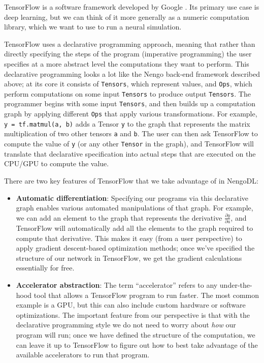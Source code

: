\documentclass{article}
\begin{document}
TensorFlow is a software framework developed by Google \citep{Abadi2016}.  Its primary use case is deep learning, but we can think of it more generally as a numeric computation library, which we want to use to run a neural simulation.

TensorFlow uses a declarative programming approach, meaning that rather than directly specifying the steps of the program (imperative programming) the user specifies at a more abstract level the computations they want to perform.  This declarative programming looks a lot like the Nengo back-end framework described above; at its core it consists of \texttt{Tensors}, which represent values, and \texttt{Ops}, which perform computations on some input \texttt{Tensors} to produce output \texttt{Tensors}. The programmer begins with some input \texttt{Tensors}, and then builds up a computation graph by applying different \texttt{Ops} that apply various transformations.  For example, \texttt{y = tf.matmul(a, b)} adds a Tensor \texttt{y} to the graph that represents the matrix multiplication of two other tensors \texttt{a} and \texttt{b}.  The user can then ask TensorFlow to compute the value of \texttt{y} (or any other \texttt{Tensor} in the graph), and TensorFlow will translate that declarative specification into actual steps that are executed on the CPU/GPU to compute the value.

There are two key features of TensorFlow that we take advantage of in NengoDL:

\begin{itemize}
\item {\bf Automatic differentiation}: Specifying our programs via this declarative graph enables various automated manipulations of that graph.  For example, we can add an element to the graph that represents the derivative $\frac{\partial y}{\partial a}$, and TensorFlow will automatically add all the elements to the graph required to compute that derivative.  This makes it easy (from a user perspective) to apply gradient descent-based optimization methods; once we've specified the structure of our network in TensorFlow, we get the gradient calculations essentially for free.
\item {\bf Accelerator abstraction}: The term ``accelerator'' refers to any under-the-hood tool that allows a TensorFlow program to run faster.  The most common example is a GPU, but this can also include custom hardware or software optimizations.  The important feature from our perspective is that with the declarative programming style we do not need to worry about \emph{how} our program will run; once we have defined the structure of the computation, we can leave it up to TensorFlow to figure out how to best take advantage of the available accelerators to run that program.
\end{itemize}
\end{document}

